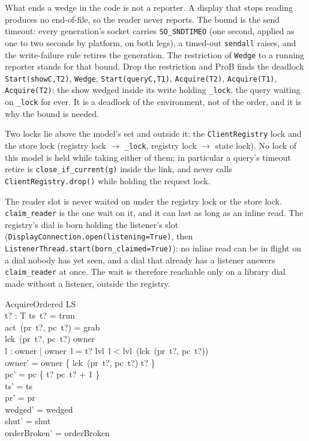 \documentclass[a4paper,10pt,fleqn]{article}
\begin{document}
What ends a wedge in the code is not a reporter.  A display that stops
reading produces no end-of-file, so the reader never reports.  The bound is the
send timeout: every generation's socket carries \texttt{SO\_SNDTIMEO} (one second,
applied as one to two seconds by platform, on both legs), a timed-out \texttt{sendall} raises, and the
write-failure rule retires the generation.  The restriction of \texttt{Wedge}
to a running reporter stands for that bound.  Drop the restriction and ProB
finds the deadlock \texttt{Start(showC,T2)}, \texttt{Wedge},
\texttt{Start(queryC,T1)}, \texttt{Acquire(T2)}, \texttt{Acquire(T1)},
\texttt{Acquire(T2)}: the show wedged inside its write holding
\texttt{\_lock}, the query waiting on \texttt{\_lock} for ever.  It is a
deadlock of the environment, not of the order, and it is why the bound is
needed.

Two locks lie above the model's set and outside it: the
\texttt{ClientRegistry} lock and the store lock (registry lock $\to$
\texttt{\_lock}, registry lock $\to$ state lock).  No lock of this model is held
while taking either of them; in particular a query's timeout retire is
\texttt{close\_if\_current(g)} inside the link, and never calls
\texttt{ClientRegistry.drop()} while holding the request lock.

The reader slot is never waited on under the registry lock or the store lock.
\texttt{claim\_reader} is the one wait on it, and it can last as long as an
inline read.  The registry's dial is born holding the listener's slot
(\texttt{DisplayConnection.open(listening=True)}, then
\texttt{ListenerThread.start(born\_claimed=True)}): no inline read can be in
flight on a dial nobody has yet seen, and a dial that already has a listener
answers \texttt{claim\_reader} at once.  The wait is therefore reachable only
on a library dial made without a listener, outside the registry.

\begin{schema}{AcquireOrdered}
  \Delta LS \\
  t? : T
\where
  ts~t? = trun \\
  act~(pr~t?, pc~t?) = grab \\
  lck~(pr~t?, pc~t?) \notin \dom owner \\
  \forall l : \dom owner | owner~l = t? \spot
    lvl~l < lvl~(lck~(pr~t?, pc~t?)) \\
  owner' = owner \cup \{ lck~(pr~t?, pc~t?) \mapsto t? \} \\
  pc' = pc \oplus \{ t? \mapsto pc~t? + 1 \} \\
  ts' = ts \\
  pr' = pr \\
  wedged' = wedged \\
  shut' = shut \\
  orderBroken' = orderBroken
\end{schema}
\end{document}
